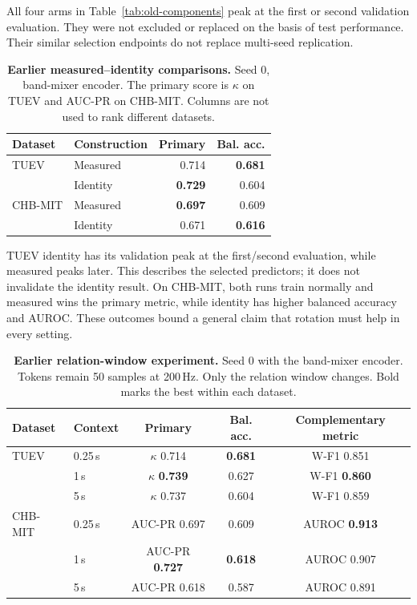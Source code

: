 \documentclass[10pt,twocolumn,letterpaper]{article}
\newcommand{\TableStyle}{\fontsize{8}{9.5}\selectfont\setlength{\tabcolsep}{3pt}\renewcommand{\arraystretch}{1.10}}
\begin{document}
All four arms in Table~\ref{tab:old-components} peak at the first or
second validation evaluation. They were not excluded or replaced on
the basis of test performance. Their similar selection endpoints do
not replace multi-seed replication.

\begin{table}[t]
\centering\TableStyle
\caption{\textbf{Earlier measured--identity comparisons.} Seed 0,
band-mixer encoder. The primary score is $\kappa$ on TUEV and AUC-PR
on CHB-MIT. Columns are not used to rank different datasets.}
\label{tab:identity}
\begin{tabular*}{\linewidth}{@{\extracolsep{\fill}}llrr@{}}
\toprule
Dataset & Construction & Primary & Bal. acc.\\
\midrule
TUEV & Measured & 0.714 & \textbf{0.681}\\
     & Identity & \textbf{0.729} & 0.604\\
\midrule
CHB-MIT & Measured & \textbf{0.697} & 0.609\\
        & Identity & 0.671 & \textbf{0.616}\\
\bottomrule
\end{tabular*}
\end{table}

TUEV identity has its validation peak at the first/second evaluation,
while measured peaks later. This describes the selected predictors;
it does not invalidate the identity result. On CHB-MIT, both runs train
normally and measured wins the primary metric, while identity has
higher balanced accuracy and AUROC. These outcomes bound a general
claim that rotation must help in every setting.

\begin{table}[t]
\centering\TableStyle
\caption{\textbf{Earlier relation-window experiment.} Seed 0 with the
band-mixer encoder. Tokens remain 50 samples at 200\,Hz. Only the
relation window changes. Bold marks the best within each dataset.}
\label{tab:windows}
\begin{tabular}{llccc}
\toprule
Dataset & Context & Primary & Bal. acc. & Complementary metric\\
\midrule
TUEV & 0.25\,s & $\kappa$ 0.714 & \textbf{0.681} & W-F1 0.851\\
 & 1\,s & $\kappa$ \textbf{0.739} & 0.627 & W-F1 \textbf{0.860}\\
 & 5\,s & $\kappa$ 0.737 & 0.604 & W-F1 0.859\\
\midrule
CHB-MIT & 0.25\,s & AUC-PR 0.697 & 0.609 & AUROC \textbf{0.913}\\
 & 1\,s & AUC-PR \textbf{0.727} & \textbf{0.618} & AUROC 0.907\\
 & 5\,s & AUC-PR 0.618 & 0.587 & AUROC 0.891\\
\bottomrule
\end{tabular}
\end{table}
\end{document}
